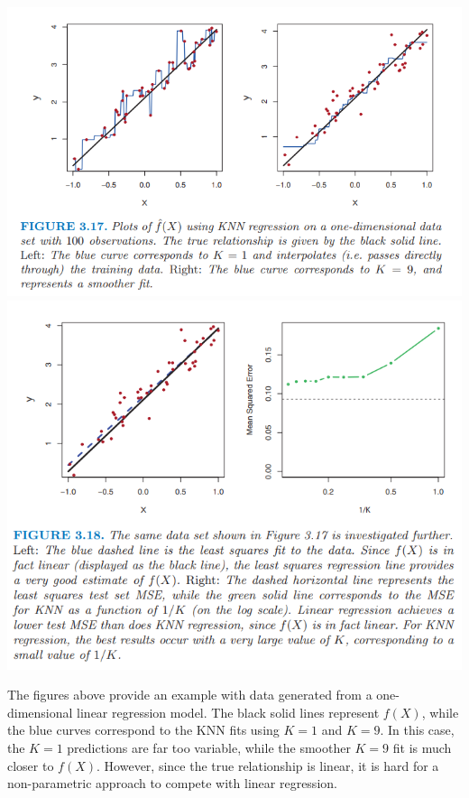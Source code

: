 \begin{center}
    \includegraphics[scale=0.8]{images/linear-reg vs knn.png}
    \includegraphics[scale=0.8]{images/knn.png}
\end{center}
The figures above provide an example with data generated from a one-dimensional linear regression model. The black solid lines represent $f(X)$, while the blue curves correspond to the KNN fits using $K = 1$ and $K = 9$. In this case, the $K = 1$ predictions are far too variable, while
the smoother $K = 9$ fit is much closer to $f(X)$. However, since the true
relationship is linear, it is hard for a non-parametric approach to compete with linear regression.
